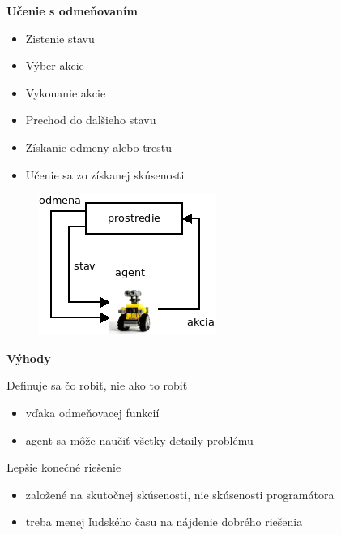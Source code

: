 \documentclass[xcolor=dvipsnames]{beamer}
\begin{document}
\begin{frame}{\bf Učenie s odmeňovaním}

\begin{minipage}{.5\textwidth}

\begin{itemize}
  \item Zistenie stavu
  \item Výber akcie
  \item Vykonanie akcie
  \item Prechod do ďalšieho stavu
  \item Získanie odmeny alebo trestu
  \item Učenie sa zo získanej skúsenosti
\end{itemize}

  \end{minipage}%
\begin{minipage}{.5\textwidth}

  \begin{figure}[!htb]
  \centering
  \includegraphics[scale=.8]{../diagrams/agent.png}
  \end{figure}

\end{minipage}

\end{frame}

\begin{frame}{\bf Výhody}

Definuje sa čo robiť, nie ako to robiť
\begin{itemize}
\item vďaka odmeňovacej funkcií
\item agent sa môže naučiť všetky detaily problému
\end{itemize}

Lepšie konečné riešenie
\begin{itemize}
\item založené na skutočnej skúsenosti, nie skúsenosti programátora
\item treba menej ľudského času na nájdenie dobrého riešenia
\end{itemize}


\end{frame}
\end{document}
